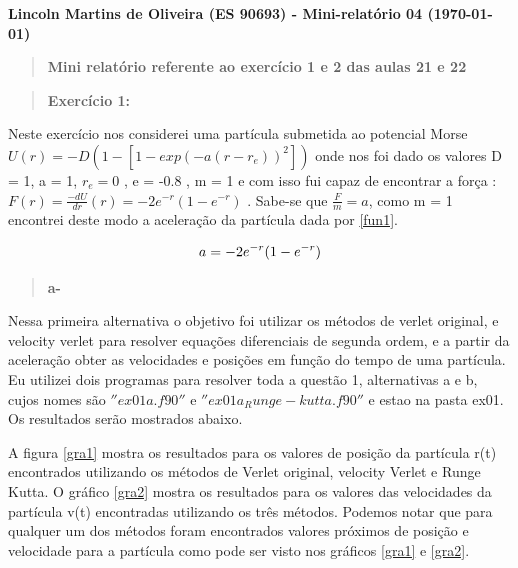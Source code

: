 \documentclass[a4wide]{report}
\begin{document}
\noindent
{\bf Lincoln Martins de Oliveira (ES 90693) - Mini-relatório 04 (\today)}

\begin{quote}

\centering

\bf Mini relatório referente ao exercício 1 e 2 das aulas 21 e 22

\end{quote}
\vspace{0.5cm}
\begin{quote}

\bf  Exercício 1:

\end{quote}

Neste exercício nos considerei uma partícula submetida ao potencial Morse $U(r) = -D (1 - [1 - exp(-a(r - r_{e}))^{2}])$ onde nos foi dado
os valores D = 1, a = 1, $r_{e} = 0$ , e = -0.8 , m = 1 e com isso fui capaz de encontrar a força : $F(r) = \frac{-dU }{dr}(r) = -2e^{-r} (1 - e^{-r} )$ .
Sabe-se que $\frac{F}{m} = a$, como m = 1 encontrei deste modo a aceleração da partícula dada por \ref{fun1}.

\begin{equation}
\centering
a = -2e^{-r} (1 - e^{-r} )
\label{fun1}
\end{equation}

\begin{quote}

\bf a-

\end{quote}

 Nessa primeira alternativa o objetivo foi utilizar os métodos de verlet original, e velocity verlet para resolver equações 
 diferenciais de segunda ordem, e a partir da aceleração obter as velocidades e posições em função do tempo de uma partícula. Eu utilizei dois programas 
 para resolver toda a questão 1, alternativas a e b, cujos nomes são $''ex01a.f90''$ e $''ex01a_Runge-kutta.f90''$ e estao na pasta ex01. Os resultados serão 
 mostrados abaixo. 
 
 A figura \ref{gra1} mostra os resultados para os valores de posição da partícula r(t) encontrados utilizando os métodos de Verlet original,
 velocity Verlet e Runge Kutta. O gráfico \ref{gra2} mostra os resultados para os valores das velocidades da partícula v(t) encontradas utilizando os três métodos.
 Podemos notar que para qualquer um dos métodos foram encontrados valores próximos de posição e velocidade para a partícula como pode ser visto nos gráficos \ref{gra1} e \ref{gra2}.
\end{document}
